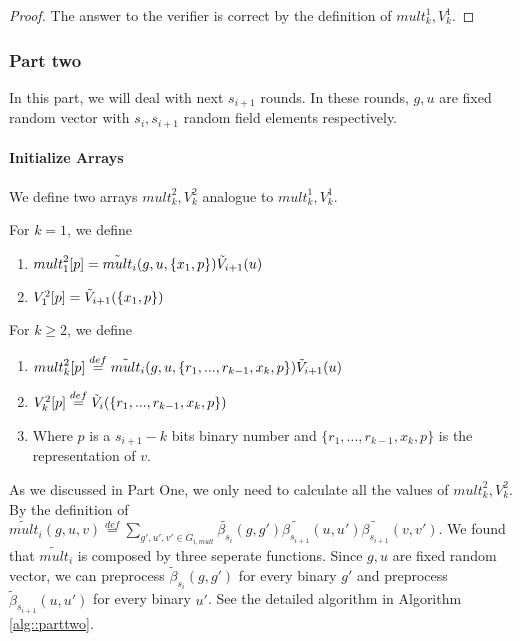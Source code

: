 {\begin{proof}
The answer to the verifier is correct by the definition of ${mult}_k^1, {V}_k^1$.
\end{proof}

\subsubsection{Part two}
In this part, we will deal with next $s_{i+1}$ rounds. In these rounds, $g, u$ are fixed random vector with $s_{i}, s_{i+1}$ random field elements respectively.

\paragraph*{Initialize Arrays}
We define two arrays ${mult}_k^2, {V}_k^2$ analogue to ${mult}_k^1, {V}_k^1$.

\begin{definition}
	For $k=1$, we define 
	\begin{enumerate}
		\item ${mult}_1^2[p] = \tilde{mult}_i(g, u, \{x_1, p\})\tilde{V}_{i+1}(u)$
		\item ${V}_1^2[p] = \tilde{V}_{i+1}(\{x_1, p\})$
	\end{enumerate}
	For $k\ge 2$, we define
	\begin{enumerate}
		\item ${mult}_k^2[p]\overset{def}{=}\tilde{mult}_i(g, u, \{r_1, ..., r_{k-1}, x_k, p\})\tilde{V}_{i+1}(u)$
		\item ${V}_k^2[p]\overset{def}{=}\tilde{V}_i(\{r_1, ..., r_{k-1}, x_k, p\})$
		\item Where $p$ is a $s_{i+1}-k$ bits binary number and $\{r_1, ..., r_{k-1}, x_k, p\}$ is the representation of $v$.
	\end{enumerate}
\end{definition}

As we discussed in Part One, we only need to calculate all the values of ${mult}_k^2, {V}_k^2$. By the definition of $\tilde{mult}_i(g, u, v)\overset{def}{=}\sum_{g', u', v' \in G_{i, mult}}\tilde{\beta_{s_i}}(g, g')\tilde{\beta_{s_{i+1}}}(u, u')\tilde{\beta_{s_{i+1}}}(v, v')$. We found that $\tilde{mult}_i$ is composed by three seperate functions. Since $g, u$ are fixed random vector, we can preprocess $\tilde{\beta}_{s_i}(g, g')$ for every binary $g'$ and preprocess $\tilde{\beta}_{s_{i+1}}(u, u')$ for every binary $u'$. See the detailed algorithm in Algorithm \ref{alg::parttwo}.

}
